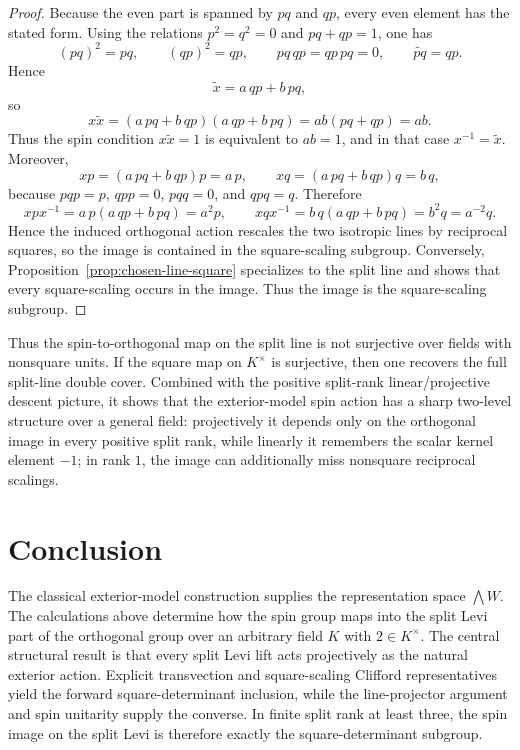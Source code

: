 \documentclass{birkjour}
\theoremstyle{plain}
\theoremstyle{definition}
\theoremstyle{remark}
\numberwithin{equation}{section}
\begin{document}
\begin{proof}
Because the even part is spanned by $pq$ and $qp$, every even element has the
stated form. Using the relations $p^2=q^2=0$ and $pq+qp=1$, one has
\[
  (pq)^2=pq,\qquad (qp)^2=qp,\qquad pq\,qp=qp\,pq=0,\qquad \widetilde{pq}=qp.
\]
Hence
\[
  \tilde x = a\,qp+b\,pq,
\]
so
\[
  x\tilde x
  =(a\,pq+b\,qp)(a\,qp+b\,pq)
  =ab(pq+qp)
  =ab.
\]
Thus the spin condition $x\tilde x=1$ is equivalent to $ab=1$, and in that case
$x^{-1}=\tilde x$. Moreover,
\[
  xp=(a\,pq+b\,qp)p=a\,p,\qquad xq=(a\,pq+b\,qp)q=b\,q,
\]
because $pqp=p$, $qpp=0$, $pqq=0$, and $qpq=q$. Therefore
\[
  xpx^{-1}=a\,p(a\,qp+b\,pq)=a^2p,
  \qquad
  xqx^{-1}=b\,q(a\,qp+b\,pq)=b^2q=a^{-2}q.
\]
Hence the induced orthogonal action rescales the two isotropic lines by
reciprocal squares, so the image is contained in the square-scaling subgroup.
Conversely, Proposition~\ref{prop:chosen-line-square} specializes to the split
line and shows that every square-scaling occurs in the image. Thus the image is
the square-scaling subgroup.
\end{proof}

Thus the spin-to-orthogonal map on the split line is not surjective over fields
with nonsquare units. If the square map on $K^\times$ is surjective, then one
recovers the full split-line double cover. Combined with the positive split-rank
linear/projective descent picture, it shows that the exterior-model spin action
has a sharp two-level structure over a general field: projectively it depends
only on the orthogonal image in every positive split rank, while linearly it
remembers the scalar kernel element $-1$; in rank $1$, the image can
additionally miss nonsquare reciprocal scalings.

\section{Conclusion}
\label{sec:conclusion}

The classical exterior-model construction supplies the representation space
\(\bigwedge W\). The calculations above determine how the spin group maps
into the split Levi part of the orthogonal group over an arbitrary field
\(K\) with \(2\in K^\times\). The central structural result is that every split
Levi lift acts projectively as the natural exterior action. Explicit
transvection and square-scaling Clifford representatives yield the forward
square-determinant inclusion, while the line-projector argument and spin
unitarity supply the converse. In finite split rank at least three,
the spin image on the split Levi is therefore exactly the square-determinant
subgroup.
\end{document}
